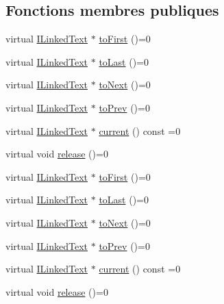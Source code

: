 \subsection*{Fonctions membres publiques}
\begin{DoxyCompactItemize}
\item 
virtual \hyperlink{class_i_linked_text}{I\+Linked\+Text} $\ast$ \hyperlink{class_i_linked_text_iterator_aa08006b03a45fb041643f3e800a824b1}{to\+First} ()=0
\item 
virtual \hyperlink{class_i_linked_text}{I\+Linked\+Text} $\ast$ \hyperlink{class_i_linked_text_iterator_a1b6a262c370835c034d683f62e9cc874}{to\+Last} ()=0
\item 
virtual \hyperlink{class_i_linked_text}{I\+Linked\+Text} $\ast$ \hyperlink{class_i_linked_text_iterator_abf50d307500a5eac81ba9490798efa0f}{to\+Next} ()=0
\item 
virtual \hyperlink{class_i_linked_text}{I\+Linked\+Text} $\ast$ \hyperlink{class_i_linked_text_iterator_a201eb64f1c748ada8a8caefe8b8b88f1}{to\+Prev} ()=0
\item 
virtual \hyperlink{class_i_linked_text}{I\+Linked\+Text} $\ast$ \hyperlink{class_i_linked_text_iterator_a80370f714d5b6c5b7c57027f7d81de43}{current} () const  =0
\item 
virtual void \hyperlink{class_i_linked_text_iterator_a843587325f105cf1a7e1341b6aa9e5d8}{release} ()=0
\item 
virtual \hyperlink{class_i_linked_text}{I\+Linked\+Text} $\ast$ \hyperlink{class_i_linked_text_iterator_aa08006b03a45fb041643f3e800a824b1}{to\+First} ()=0
\item 
virtual \hyperlink{class_i_linked_text}{I\+Linked\+Text} $\ast$ \hyperlink{class_i_linked_text_iterator_a1b6a262c370835c034d683f62e9cc874}{to\+Last} ()=0
\item 
virtual \hyperlink{class_i_linked_text}{I\+Linked\+Text} $\ast$ \hyperlink{class_i_linked_text_iterator_abf50d307500a5eac81ba9490798efa0f}{to\+Next} ()=0
\item 
virtual \hyperlink{class_i_linked_text}{I\+Linked\+Text} $\ast$ \hyperlink{class_i_linked_text_iterator_a201eb64f1c748ada8a8caefe8b8b88f1}{to\+Prev} ()=0
\item 
virtual \hyperlink{class_i_linked_text}{I\+Linked\+Text} $\ast$ \hyperlink{class_i_linked_text_iterator_a80370f714d5b6c5b7c57027f7d81de43}{current} () const  =0
\item 
virtual void \hyperlink{class_i_linked_text_iterator_a843587325f105cf1a7e1341b6aa9e5d8}{release} ()=0
\end{DoxyCompactItemize}


